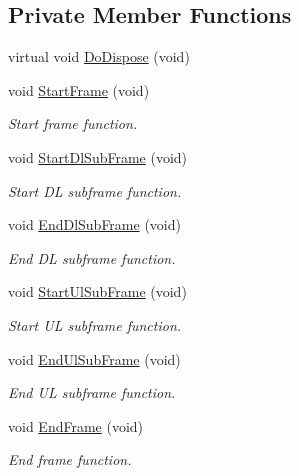 \subsection*{Private Member Functions}
\begin{DoxyCompactItemize}
\item 
virtual void \hyperlink{classns3_1_1BaseStationNetDevice_a0e29042356915d5485abbdd386e82af9}{Do\+Dispose} (void)
\item 
void \hyperlink{classns3_1_1BaseStationNetDevice_a5c6904d46b239de002ea4d947c996099}{Start\+Frame} (void)
\begin{DoxyCompactList}\small\item\em Start frame function. \end{DoxyCompactList}\item 
void \hyperlink{classns3_1_1BaseStationNetDevice_a27bab37fd4944f4c8fa93c5911effab3}{Start\+Dl\+Sub\+Frame} (void)
\begin{DoxyCompactList}\small\item\em Start DL subframe function. \end{DoxyCompactList}\item 
void \hyperlink{classns3_1_1BaseStationNetDevice_a0d20b289eddae756199cc8d11d4db589}{End\+Dl\+Sub\+Frame} (void)
\begin{DoxyCompactList}\small\item\em End DL subframe function. \end{DoxyCompactList}\item 
void \hyperlink{classns3_1_1BaseStationNetDevice_adb3fc441a44d0b6e9c1d032b73a3d34b}{Start\+Ul\+Sub\+Frame} (void)
\begin{DoxyCompactList}\small\item\em Start UL subframe function. \end{DoxyCompactList}\item 
void \hyperlink{classns3_1_1BaseStationNetDevice_acb6787d90c40a8b2e8ce2c504a172f7a}{End\+Ul\+Sub\+Frame} (void)
\begin{DoxyCompactList}\small\item\em End UL subframe function. \end{DoxyCompactList}\item 
void \hyperlink{classns3_1_1BaseStationNetDevice_abc0935e4af2375b6ebf5b62f2e041703}{End\+Frame} (void)
\begin{DoxyCompactList}\small\item\em End frame function. \end{DoxyCompactList}\item 

\end{DoxyCompactItemize}
